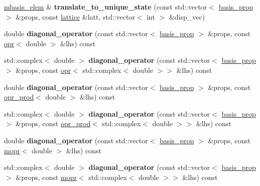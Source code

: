 \begin{DoxyCompactItemize}
\item 
\mbox{\label{classqbasis_1_1mbasis__elem_afb79d9eec0a2148d1bb90b3a8e658874}} 
\hyperlink{classqbasis_1_1mbasis__elem}{mbasis\+\_\+elem} \& {\bfseries translate\+\_\+to\+\_\+unique\+\_\+state} (const std\+::vector$<$ \hyperlink{classqbasis_1_1basis__prop}{basis\+\_\+prop} $>$ \&props, const \hyperlink{classqbasis_1_1lattice}{lattice} \&latt, std\+::vector$<$ int $>$ \&disp\+\_\+vec)
\item 
\mbox{\label{classqbasis_1_1mbasis__elem_acc68b5c0f07d0a601d9125bb195ea198}} 
double {\bfseries diagonal\+\_\+operator} (const std\+::vector$<$ \hyperlink{classqbasis_1_1basis__prop}{basis\+\_\+prop} $>$ \&props, const \hyperlink{classqbasis_1_1opr}{opr}$<$ double $>$ \&lhs) const
\item 
\mbox{\label{classqbasis_1_1mbasis__elem_a3d6b14c72d8535c1edb08a27d7808133}} 
std\+::complex$<$ double $>$ {\bfseries diagonal\+\_\+operator} (const std\+::vector$<$ \hyperlink{classqbasis_1_1basis__prop}{basis\+\_\+prop} $>$ \&props, const \hyperlink{classqbasis_1_1opr}{opr}$<$ std\+::complex$<$ double $>$$>$ \&lhs) const
\item 
\mbox{\label{classqbasis_1_1mbasis__elem_a9d2bdd64c0e2b0a5fe78bb5276e782fc}} 
double {\bfseries diagonal\+\_\+operator} (const std\+::vector$<$ \hyperlink{classqbasis_1_1basis__prop}{basis\+\_\+prop} $>$ \&props, const \hyperlink{classqbasis_1_1opr__prod}{opr\+\_\+prod}$<$ double $>$ \&lhs) const
\item 
\mbox{\label{classqbasis_1_1mbasis__elem_aaf3f36af336ecf4dbdecf0db00a4bb99}} 
std\+::complex$<$ double $>$ {\bfseries diagonal\+\_\+operator} (const std\+::vector$<$ \hyperlink{classqbasis_1_1basis__prop}{basis\+\_\+prop} $>$ \&props, const \hyperlink{classqbasis_1_1opr__prod}{opr\+\_\+prod}$<$ std\+::complex$<$ double $>$$>$ \&lhs) const
\item 
\mbox{\label{classqbasis_1_1mbasis__elem_a2ffecd6abe56560d92c31ef17151c41e}} 
double {\bfseries diagonal\+\_\+operator} (const std\+::vector$<$ \hyperlink{classqbasis_1_1basis__prop}{basis\+\_\+prop} $>$ \&props, const \hyperlink{classqbasis_1_1mopr}{mopr}$<$ double $>$ \&lhs) const
\item 
\mbox{\label{classqbasis_1_1mbasis__elem_a8badf8f35594ccfd65e706c4fec6bb13}} 
std\+::complex$<$ double $>$ {\bfseries diagonal\+\_\+operator} (const std\+::vector$<$ \hyperlink{classqbasis_1_1basis__prop}{basis\+\_\+prop} $>$ \&props, const \hyperlink{classqbasis_1_1mopr}{mopr}$<$ std\+::complex$<$ double $>$$>$ \&lhs) const
\end{DoxyCompactItemize}
